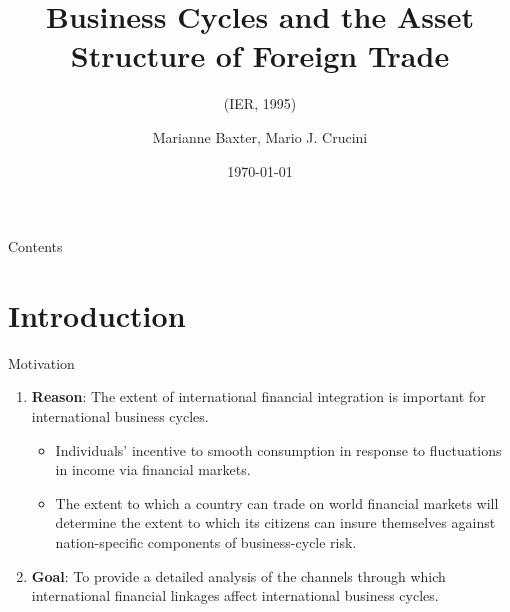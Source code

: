 \documentclass[10pt]{beamer}
\begin{document}
\title{Business Cycles and the Asset Structure of Foreign Trade}
\subtitle{(IER, 1995)}
\author{Marianne Baxter, Mario J. Crucini}

\date{\today}

\begin{frame}[plain]
  \titlepage
\end{frame}

\begin{frame}{Contents}
\tableofcontents
\end{frame}

\section{Introduction}
\begin{frame}{Motivation}
\begin{enumerate}
  \item \textbf{Reason}: The extent of international \alert{financial integration} is important for international \alert{business cycles}.
\begin{itemize}
  \item Individuals' incentive to \alert{smooth consumption} in response to fluctuations in income via financial markets.
  \item The extent to which a country can trade on world financial markets will determine the extent to which its citizens can \alert{insure} themselves against nation-specific components of \alert{business-cycle risk}.
\end{itemize}
  \item \textbf{Goal}: To provide a detailed analysis of the channels through which international financial linkages affect international business cycles.
\end{enumerate}
\end{frame}
\end{document}
